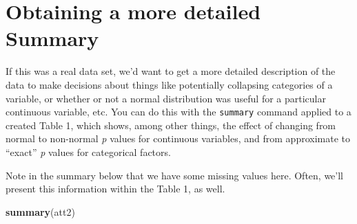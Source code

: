 \documentclass[]{book}
\newenvironment{Shaded}{\begin{snugshade}}{\end{snugshade}}
\newcommand{\KeywordTok}[1]{\textcolor[rgb]{0.13,0.29,0.53}{\textbf{#1}}}
\newcommand{\NormalTok}[1]{#1}
\theoremstyle{definition}
\theoremstyle{definition}
\theoremstyle{definition}
\theoremstyle{remark}
\begin{document}
\section{Obtaining a more detailed
Summary}\label{obtaining-a-more-detailed-summary}

If this was a real data set, we'd want to get a more detailed
description of the data to make decisions about things like potentially
collapsing categories of a variable, or whether or not a normal
distribution was useful for a particular continuous variable, etc. You
can do this with the \texttt{summary} command applied to a created Table
1, which shows, among other things, the effect of changing from normal
to non-normal \emph{p} values for continuous variables, and from
approximate to ``exact'' \emph{p} values for categorical factors.

Note in the summary below that we have some missing values here. Often,
we'll present this information within the Table 1, as well.

\begin{Shaded}
\begin{Highlighting}[]
\KeywordTok{summary}\NormalTok{(att2)}
\end{Highlighting}
\end{Shaded}
\end{document}
